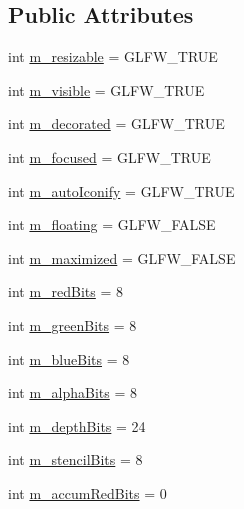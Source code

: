 \subsection*{Public Attributes}
\begin{DoxyCompactItemize}
\item 
int \mbox{\hyperlink{structec_1_1_window_creation_hints_a47312559cec4d56ee01b148d5b3cb711}{m\+\_\+resizable}} = G\+L\+F\+W\+\_\+\+T\+R\+UE
\item 
int \mbox{\hyperlink{structec_1_1_window_creation_hints_ab32e332ec3126d619bbd920ee3842b3f}{m\+\_\+visible}} = G\+L\+F\+W\+\_\+\+T\+R\+UE
\item 
int \mbox{\hyperlink{structec_1_1_window_creation_hints_accce8644252e46fd8d6da159b4c2b78c}{m\+\_\+decorated}} = G\+L\+F\+W\+\_\+\+T\+R\+UE
\item 
int \mbox{\hyperlink{structec_1_1_window_creation_hints_a1bb5680092c537626277de7626c08054}{m\+\_\+focused}} = G\+L\+F\+W\+\_\+\+T\+R\+UE
\item 
int \mbox{\hyperlink{structec_1_1_window_creation_hints_adc4b7c26f61f184dd1c3d5ccdca11f0e}{m\+\_\+auto\+Iconify}} = G\+L\+F\+W\+\_\+\+T\+R\+UE
\item 
int \mbox{\hyperlink{structec_1_1_window_creation_hints_afc11b8ea383b4485e594b90170c91475}{m\+\_\+floating}} = G\+L\+F\+W\+\_\+\+F\+A\+L\+SE
\item 
int \mbox{\hyperlink{structec_1_1_window_creation_hints_ab77d85ca54cdf41d3302982630a34d8d}{m\+\_\+maximized}} = G\+L\+F\+W\+\_\+\+F\+A\+L\+SE
\item 
int \mbox{\hyperlink{structec_1_1_window_creation_hints_a038736ff6382e06c07127595970bfaf1}{m\+\_\+red\+Bits}} = 8
\item 
int \mbox{\hyperlink{structec_1_1_window_creation_hints_a05c4a63ab5c715c61de6eeca97d8c3eb}{m\+\_\+green\+Bits}} = 8
\item 
int \mbox{\hyperlink{structec_1_1_window_creation_hints_a3bb9c950dbff85c314cc6a9e71dad56f}{m\+\_\+blue\+Bits}} = 8
\item 
int \mbox{\hyperlink{structec_1_1_window_creation_hints_a51ab0d52ddc09d1e05166a8cb72e15e1}{m\+\_\+alpha\+Bits}} = 8
\item 
int \mbox{\hyperlink{structec_1_1_window_creation_hints_ad7b8571c3da21ed1549fb4315a0f18d4}{m\+\_\+depth\+Bits}} = 24
\item 
int \mbox{\hyperlink{structec_1_1_window_creation_hints_a634dc1277b13e3f6f9357adbb483e8eb}{m\+\_\+stencil\+Bits}} = 8
\item 
int \mbox{\hyperlink{structec_1_1_window_creation_hints_a062467d06c359d4ae868c5c9ecbf2ccb}{m\+\_\+accum\+Red\+Bits}} = 0

\end{DoxyCompactItemize}
